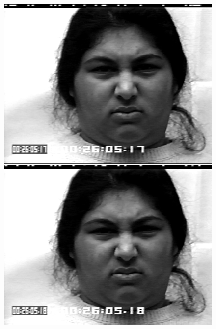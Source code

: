 \documentclass[12pt, a4paper]{scrbook}
\begin{document}
\begin{figure}[h]
\begin{minipage}[b]{.2\linewidth}
		\includegraphics[width=\linewidth]{Bilder/Disgust5.png}
	\end{minipage}
	\hspace{.025\linewidth}%
	\begin{minipage}[b]{.2\linewidth} %
		\includegraphics[width=\linewidth]{Bilder/Disgust6.png}
	\end{minipage}
	\hspace{.025\linewidth}%
	\begin{minipage}[b]{.2\linewidth} %

\end{minipage}
\end{figure}
\end{document}

